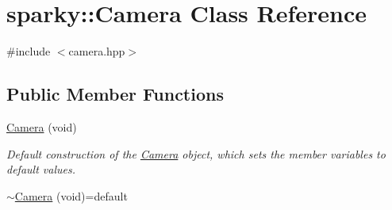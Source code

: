 \hypertarget{classsparky_1_1_camera}{}\section{sparky\+:\+:Camera Class Reference}
\label{classsparky_1_1_camera}


{\ttfamily \#include $<$camera.\+hpp$>$}

\subsection*{Public Member Functions}
\begin{DoxyCompactItemize}
\item 
\hyperlink{classsparky_1_1_camera_a78f11c9c3c475c5e4df6ba241514eefb}{Camera} (void)\hypertarget{classsparky_1_1_camera_a78f11c9c3c475c5e4df6ba241514eefb}{}\label{classsparky_1_1_camera_a78f11c9c3c475c5e4df6ba241514eefb}

\begin{DoxyCompactList}\small\item\em Default construction of the \hyperlink{classsparky_1_1_camera}{Camera} object, which sets the member variables to default values. \end{DoxyCompactList}\item 
\hyperlink{classsparky_1_1_camera_a0225d99aa0ac9fd10ded759e926c2709}{$\sim$\+Camera} (void)=default\hypertarget{classsparky_1_1_camera_a0225d99aa0ac9fd10ded759e926c2709}{}\label{classsparky_1_1_camera_a0225d99aa0ac9fd10ded759e926c2709}


\end{DoxyCompactItemize}
